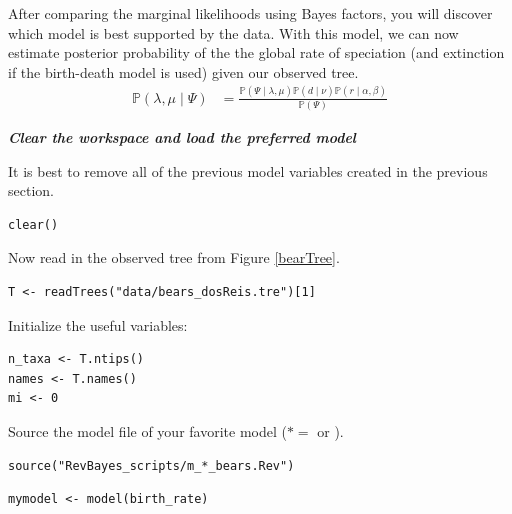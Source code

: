 After comparing the marginal likelihoods using Bayes factors, you will discover which model is best supported by the data. 
With this model, we can now estimate posterior probability of the the global rate of speciation (and extinction if the birth-death model is used) given our observed tree.
\begin{align}\label{bayesTher2}
\mathbb{P}(\lambda, \mu \mid \Psi) &= \frac{\mathbb{P}(\Psi \mid \lambda, \mu)\mathbb{P}(d \mid \nu)\mathbb{P}(r \mid \alpha, \beta)}{\mathbb{P}(\Psi)}
\end{align}




\textbf{\textit{Clear the workspace and load the preferred model}}

It is best to remove all of the previous model variables created in the previous section.
{\tt \begin{snugshade*}
\begin{lstlisting}
clear()
\end{lstlisting}
\end{snugshade*}}


Now read in the observed tree from Figure \ref{bearTree}. 
{\tt \begin{snugshade*}
\begin{lstlisting}
T <- readTrees("data/bears_dosReis.tre")[1]
\end{lstlisting}
\end{snugshade*}}

Initialize the useful variables:
{\tt \begin{snugshade*}
\begin{lstlisting}
n_taxa <- T.ntips()
names <- T.names()
mi <- 0 
\end{lstlisting}
\end{snugshade*}}



Source the model file of your favorite model ($* = $  or ).
{\tt \begin{snugshade*}
\begin{lstlisting}
source("RevBayes_scripts/m_*_bears.Rev")
\end{lstlisting}
\end{snugshade*}}

{\tt \begin{snugshade*}
\begin{lstlisting}
mymodel <- model(birth_rate)
\end{lstlisting}
\end{snugshade*}}


